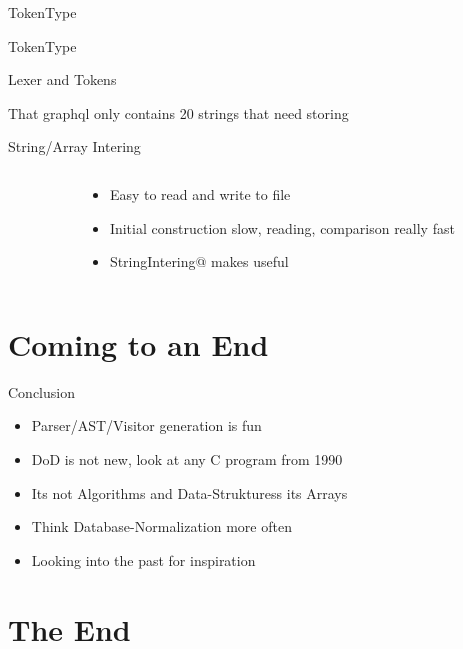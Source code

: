\documentclass[aspectratio=169,notes]{beamer}
\begin{document}
	\begin{frame}[fragile]{TokenType}
		
	\end{frame}

	\begin{frame}[fragile]{TokenType}
		
	\end{frame}

	\begin{frame}[fragile]{Lexer and Tokens}
		

		That graphql only contains 20 strings that need storing
	\end{frame}

	\begin{frame}[fragile]{String/Array Intering}
		\begin{columns}[t]
			\begin{column}{0.65\textwidth}
				
			\end{column}
			\pause
			\begin{column}{0.35\textwidth}
				\begin{itemize}
					\item Easy to read and write to file
					\item Initial construction slow, reading, comparison really fast
					\item \lstinline@const StringIntering@ makes \lstinline@const@ useful
				\end{itemize}
			\end{column}
		\end{columns}
	\end{frame}

	\section{Coming to an End}
	\begin{frame}[fragile]{Conclusion}
		\begin{itemize}
			\item Parser/AST/Visitor generation is fun
			\item DoD is not new, look at any C program from 1990
			\item Its not Algorithms and Data-Strukturess its Arrays
			\item Think Database-Normalization more often
			\item Looking into the past for inspiration
		\end{itemize}
	\end{frame}

	\section{The End}
\end{document}
